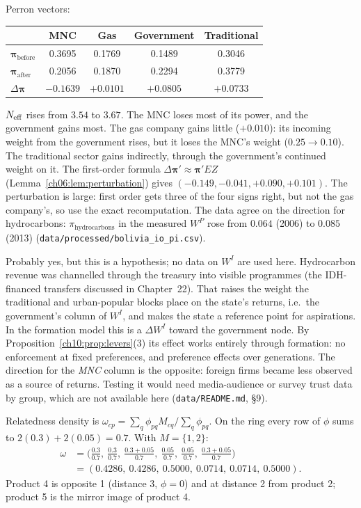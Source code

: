 \documentclass[../solutions_manual.tex]{subfiles}
\begin{document}
 Perron vectors:
\begin{center}
\begin{tabular}{lcccc}
\toprule
& MNC & Gas & Government & Traditional \\
\midrule
$\boldsymbol{\pi}_{\text{before}}$ & 0.3695 & 0.1769 & 0.1489 & 0.3046 \\
$\boldsymbol{\pi}_{\text{after}}$ & 0.2056 & 0.1870 & 0.2294 & 0.3779 \\
$\Delta\boldsymbol{\pi}$ & $-0.1639$ & $+0.0101$ & $+0.0805$ & $+0.0733$ \\
\bottomrule
\end{tabular}
\end{center}
$N_{\text{eff}}$ rises from $3.54$ to $3.67$. The MNC loses most of its power, and the government gains most. The gas company gains little ($+0.010$): its incoming weight from the government rises, but it loses the MNC's weight ($0.25 \to 0.10$). The traditional sector gains indirectly, through the government's continued weight on it. The first-order formula $\Delta\boldsymbol{\pi}' \approx \boldsymbol{\pi}'EZ$ (Lemma~\ref{ch06:lem:perturbation}) gives $(-0.149, -0.041, +0.090, +0.101)$. The perturbation is large: first order gets three of the four signs right, but not the gas company's, so use the exact recomputation. The data agree on the direction for hydrocarbons: $\pi_{\text{hydrocarbons}}$ in the measured $W^P$ rose from $0.064$ (2006) to $0.085$ (2013) (\texttt{data/processed/bolivia\_io\_pi.csv}).

 Probably yes, but this is a hypothesis; no data on $W^I$ are used here. Hydrocarbon revenue was channelled through the treasury into visible programmes (the IDH-financed transfers discussed in Chapter~22). That raises the weight the traditional and urban-popular blocks place on the state's returns, i.e.\ the government's column of $W^I$, and makes the state a reference point for aspirations. In the formation model this is a $\Delta W^I$ toward the government node. By Proposition~\ref{ch10:prop:levers}(3) its effect works entirely through formation: no enforcement at fixed preferences, and preference effects over generations. The direction for the \emph{MNC} column is the opposite: foreign firms became less observed as a source of returns. Testing it would need media-audience or survey trust data by group, which are not available here (\texttt{data/README.md}, \S9).

 Relatedness density \citep{hidalgo2007product} is $\omega_{cp} = \sum_q\phi_{pq}M_{cq}/\sum_q\phi_{pq}$. On the ring every row of $\phi$ sums to $2(0.3) + 2(0.05) = 0.7$. With $M = \{1, 2\}$:
\[
\begin{aligned}
\omega &= \Big(\tfrac{0.3}{0.7},\ \tfrac{0.3}{0.7},\ \tfrac{0.3 + 0.05}{0.7},\ \tfrac{0.05}{0.7},\ \tfrac{0.05}{0.7},\ \tfrac{0.3 + 0.05}{0.7}\Big)\\
&= (0.4286,\ 0.4286,\ 0.5000,\ 0.0714,\ 0.0714,\ 0.5000).
\end{aligned}
\]
Product 4 is opposite 1 (distance 3, $\phi = 0$) and at distance 2 from product 2; product 5 is the mirror image of product 4.
\end{document}
